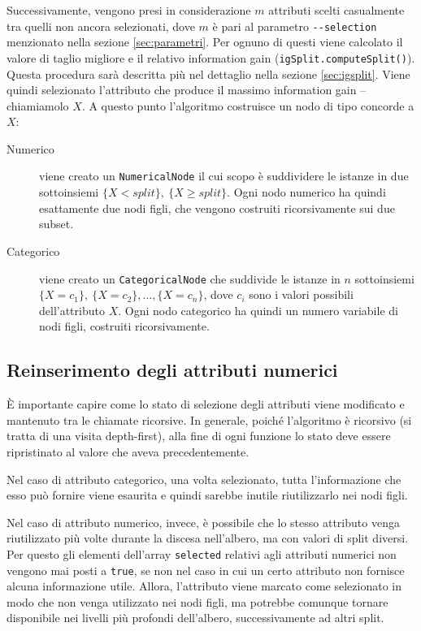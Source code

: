 \documentclass[a4paper,11pt,twoside,openright,fleqn]{book}
\newcommand{\code}[1]{\texttt{#1}}
\begin{document}
Successivamente, vengono presi in considerazione $m$ attributi scelti casualmente tra quelli non ancora selezionati, dove $m$ è pari al parametro \code{-{}-selection} menzionato nella sezione \ref{sec:parametri}. Per ognuno di questi viene calcolato il valore di taglio migliore e il relativo information gain (\code{igSplit.computeSplit()}). Questa procedura sarà descritta più nel dettaglio nella sezione \ref{sec:igsplit}. Viene quindi selezionato l'attributo che produce il massimo information gain -- chiamiamolo $X$. A questo punto l'algoritmo costruisce un nodo di tipo concorde a $X$:
\begin{description}
\item[Numerico] viene creato un \code{NumericalNode} il cui scopo è suddividere le istanze in due sottoinsiemi $\{X < \textit{split}\},\ \{X \geq \textit{split}\}$. Ogni nodo numerico ha quindi esattamente due nodi figli, che vengono costruiti ricorsivamente sui due subset.
\item[Categorico] viene creato un \code{CategoricalNode} che suddivide le istanze in $n$ sottoinsiemi $\{X = c_1\},\ \{X = c_2\},\dots, \{X = c_n\}$, dove $c_i$ sono i valori possibili dell'attributo $X$. Ogni nodo categorico ha quindi un numero variabile di nodi figli, costruiti ricorsivamente.
\end{description}

\subsection{Reinserimento degli attributi numerici}

È importante capire come lo stato di selezione degli attributi viene modificato e mantenuto tra le chiamate ricorsive. In generale, poiché l'algoritmo è ricorsivo (si tratta di una visita depth-first), alla fine di ogni funzione lo stato deve essere ripristinato al valore che aveva precedentemente.

Nel caso di attributo categorico, una volta selezionato, tutta l'informazione che esso può fornire viene esaurita e quindi sarebbe inutile riutilizzarlo nei nodi figli.

Nel caso di attributo numerico, invece, è possibile che lo stesso attributo venga riutilizzato più volte durante la discesa nell'albero, ma con valori di split diversi. Per questo gli elementi dell'array \code{selected} relativi agli attributi numerici non vengono mai posti a \code{true}, se non nel caso in cui un certo attributo non fornisce alcuna informazione utile. Allora, l'attributo viene marcato come selezionato in modo che non venga utilizzato nei nodi figli, ma potrebbe comunque tornare disponibile nei livelli più profondi dell'albero, successivamente ad altri split.
\end{document}
